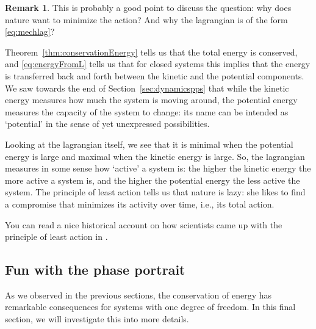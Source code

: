 \documentclass[english,fontsize=11pt,paper=b5]{scrbook}
\theoremstyle{definition}
\newtheorem{remark}{Remark}[chapter]
\begin{document}
    \begin{remark}
      This is probably a good point to discuss the question: why does nature want to minimize the action? And why the lagrangian is of the form \eqref{eq:mechlag}?

      Theorem~\ref{thm:conservationEnergy} tells us that the total energy is conserved, and \eqref{eq:energyFromL} tells us that for closed systems this implies that the energy is transferred back and forth between the kinetic and the potential components.
      We saw towards the end of Section~\ref{sec:dynamicspps} that while the kinetic energy measures how much the system is moving around, the potential energy measures the capacity of the system to change: its name can be intended as `potential' in the sense of yet unexpressed possibilities.

      Looking at the lagrangian itself, we see that it is minimal when the potential energy is large and maximal when the kinetic energy is large.
      So, the lagrangian measures in some sense how `active' a system is: the higher the kinetic energy the more active a system is, and the higher the potential energy the less active the system.
      The principle of least action tells us that nature is lazy: she likes to find a compromise that minimizes its activity over time, i.e., its total action.

      You can read a nice historical account on how scientists came up with the principle of least action in \cite{lectures:baez}.
    \end{remark}



    \subsection{Fun with the phase portrait}\label{sec:1deg-again}

    As we observed in the previous sections, the conservation of energy has remarkable consequences for systems with one degree of freedom.
    In this final section, we will investigate this into more details.
\end{document}
